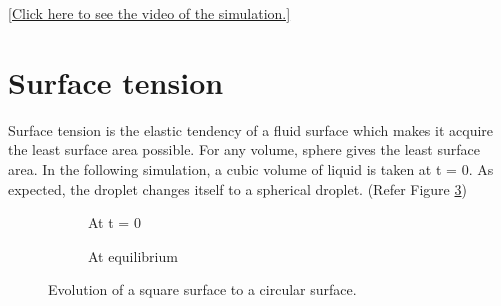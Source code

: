 \documentclass[11pt]{article}
\begin{document}
\begin{flushright}
	\href{https://www.youtube.com/watch?v=B9JiYVE437Y}{[Click here to see the video of the simulation.]}
\end{flushright}
   
\section{Surface tension}
Surface tension is the elastic tendency of a fluid surface which makes it acquire the least surface area possible. For any volume, sphere gives the least surface area. In the following simulation, a cubic volume of liquid is taken at t = 0. As expected, the droplet changes itself to a spherical droplet. (Refer Figure \ref{fig:surface_tension})

\begin{figure}[h!]
	\centering
	\begin{subfigure}[h!]{5cm}            
		\caption{At t = 0}
		\label{Fig:surface_initial}
	\end{subfigure}
	\begin{subfigure}[h!]{5cm}
		\centering
		\caption{At equilibrium }
		\label{Fig:surface_final}
	\end{subfigure}
	\caption{Evolution of a square surface to a circular surface.}\label{fig:surface_tension}
\end{figure}
\end{document}
